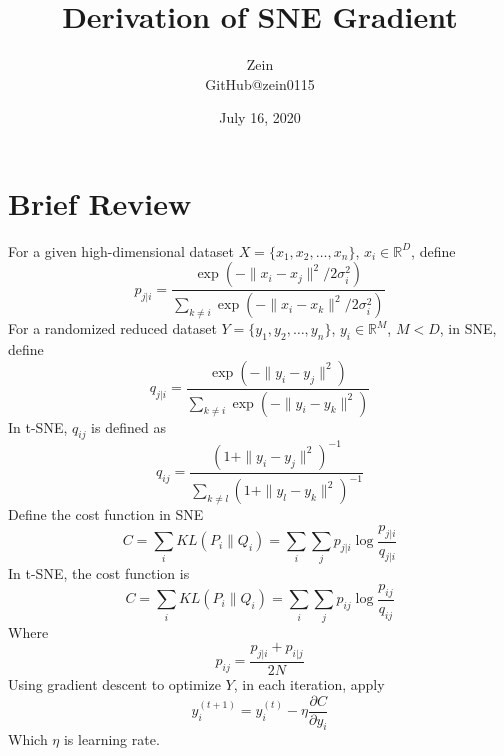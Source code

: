 \documentclass[11pt]{article}
\title{Derivation of SNE Gradient}
\author{Zein\\GitHub@zein0115}
\date{July 16, 2020}
\begin{document}
\maketitle

\section{Brief Review\cite{maaten2008visualizing}}
For a given high-dimensional dataset $X = \{x_1, x_2, \dots, x_n\}$, $x_i\in \mathbb{R} ^D$, define
$$
    p_{j|i} = \frac{\exp(-\| x_i - x_j \|^2/2\sigma_i^2)}{\sum_{k\neq i}
    {\exp(-\| x_i - x_k \|^2/2\sigma_i^2)}}
$$
For a randomized reduced dataset $Y = \{y_1, y_2, \dots, y_n\}$, $y_i\in \mathbb{R} ^M$, $M<D$, in SNE, define
$$
    q_{j|i}  = \frac{\exp(-\| y_i - y_j \|^2)}{\sum_{k\neq i}{\exp(-\| y_i - y_k \|^2)}}
$$
In t-SNE, $q_{ij}$ is defined as
$$
    q_{ij} = \frac{(1+\| y_i - y_j \|^2)^{-1}}{\sum_{k\neq l}{(1+\| y_l - y_k \|^2)^{-1}}}
$$
Define the cost function in SNE
$$
    C = \sum_{i}KL(P_i \| Q_i) = \sum_i \sum_j p_{j|i} \log\frac{p_{j|i}}{q_{j|i}}
$$
In t-SNE, the cost function is
$$
    C = \sum_{i}KL(P_i \| Q_i) = \sum_i \sum_j p_{ij} \log\frac{p_{ij}}{q_{ij}}
$$
Where
$$
    p_{ij} = \frac{p_{j|i} + p_{i|j}}{2N}
$$
Using gradient descent to optimize $Y$, in each iteration, apply
$$
    y_i^{(t+1)} = y_i^{(t)} - \eta\frac{\partial{C}}{\partial{y_i}}
$$
Which $\eta$ is learning rate.
\end{document}
